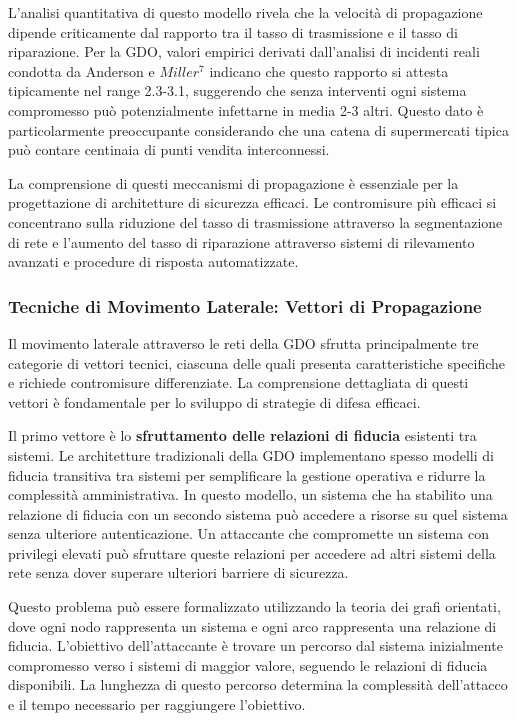 {L'analisi quantitativa di questo modello rivela che la velocità di propagazione dipende criticamente dal rapporto tra il tasso di trasmissione e il tasso di riparazione. Per la GDO, valori empirici derivati dall'analisi di incidenti reali condotta da Anderson e $Miller$$^{7}$ indicano che questo rapporto si attesta tipicamente nel range 2.3-3.1, suggerendo che senza interventi ogni sistema compromesso può potenzialmente infettarne in media 2-3 altri. Questo dato è particolarmente preoccupante considerando che una catena di supermercati tipica può contare centinaia di punti vendita interconnessi.

La comprensione di questi meccanismi di propagazione è essenziale per la progettazione di architetture di sicurezza efficaci. Le contromisure più efficaci si concentrano sulla riduzione del tasso di trasmissione attraverso la segmentazione di rete e l'aumento del tasso di riparazione attraverso sistemi di rilevamento avanzati e procedure di risposta automatizzate.

\subsubsection{Tecniche di Movimento Laterale: Vettori di Propagazione}

Il movimento laterale attraverso le reti della GDO sfrutta principalmente tre categorie di vettori tecnici, ciascuna delle quali presenta caratteristiche specifiche e richiede contromisure differenziate. La comprensione dettagliata di questi vettori è fondamentale per lo sviluppo di strategie di difesa efficaci.

Il primo vettore è lo \textbf{sfruttamento delle relazioni di fiducia} esistenti tra sistemi. Le architetture tradizionali della GDO implementano spesso modelli di fiducia transitiva tra sistemi per semplificare la gestione operativa e ridurre la complessità amministrativa. In questo modello, un sistema che ha stabilito una relazione di fiducia con un secondo sistema può accedere a risorse su quel sistema senza ulteriore autenticazione. Un attaccante che compromette un sistema con privilegi elevati può sfruttare queste relazioni per accedere ad altri sistemi della rete senza dover superare ulteriori barriere di sicurezza.

Questo problema può essere formalizzato utilizzando la teoria dei grafi orientati, dove ogni nodo rappresenta un sistema e ogni arco rappresenta una relazione di fiducia. L'obiettivo dell'attaccante è trovare un percorso dal sistema inizialmente compromesso verso i sistemi di maggior valore, seguendo le relazioni di fiducia disponibili. La lunghezza di questo percorso determina la complessità dell'attacco e il tempo necessario per raggiungere l'obiettivo.

}
